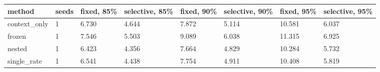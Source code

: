 \begin{tabular}{llllllll}
\hline
method & seeds & fixed, 85\% & selective, 85\% & fixed, 90\% & selective, 90\% & fixed, 95\% & selective, 95\% \\
\hline
context\_only & 1 & 6.730 & 4.644 & 7.872 & 5.114 & 10.581 & 6.037 \\
frozen & 1 & 7.546 & 5.503 & 9.089 & 6.038 & 11.315 & 6.925 \\
nested & 1 & 6.423 & 4.356 & 7.664 & 4.829 & 10.284 & 5.732 \\
single\_rate & 1 & 6.541 & 4.438 & 7.754 & 4.911 & 10.408 & 5.819 \\
\hline
\end{tabular}
